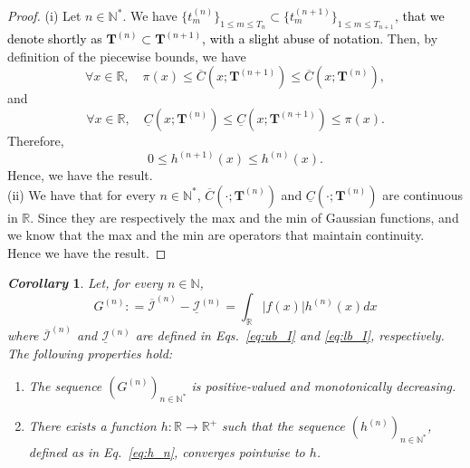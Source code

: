 \documentclass[review]{elsarticle}
\newcommand{\cblue}{\textcolor{black}}
\newtheorem{corollary}{\em Corollary}
\newcommand{\bR}{\mathbb{R}}
\begin{document}
\begin{proof}
(i)
Let $n \in \mathbb{N}^*$. We have $\{t_m^{(n)} \}_{1 \leq m \leq T_n} \subset \{t_m^{(n+1)} \}_{1 \leq m \leq T_{n+1} }$, \cblue{that we denote shortly as $\mathbf{T}^{(n)} \subset \mathbf{T}^{(n+1)}$, with a slight abuse of notation}. Then, by definition of the piecewise bounds, we have
\begin{equation}
\forall x \in \mathbb{R}, \quad \pi(x) \leq \overline{C}(x;\mathbf{T}^{(n+1)})  \leq \overline{C}(x;\mathbf{T}^{(n)}),
\end{equation}
and
\begin{equation}
\forall x \in \mathbb{R}, \quad 
\underline{C}(x;\mathbf{T}^{(n)})  \leq \underline{C}(x;\mathbf{T}^{(n+1)}) \leq \pi(x).
\end{equation}
Therefore,
\begin{equation}
0 \leq h^{(n+1)}(x)  \leq h^{(n)}(x).
\end{equation}
Hence, we have the result. \\
(ii) 
We have that for every $n \in \mathbb{N}^*$, $\overline{C}(\cdot;\mathbf{T}^{(n)})$ and $\underline{C}(\cdot;\mathbf{T}^{(n)})$ are continuous in $\mathbb{R}$. Since they are respectively the max and the min of Gaussian functions, and we know that the max and the min are operators that maintain continuity.\\
Hence we have the result.
\end{proof}

\begin{corollary}
Let, for every \( n \in \mathbb{N} \),
\begin{equation}
    G^{(n)} : = \overline{\mathcal{I}}^{(n)} - \underline{\mathcal{I}}^{(n)} = \int_{\bR}|f(x)|h^{(n)}(x)dx
    \label{eq:G_n}
\end{equation}
where \( \overline{\mathcal{I}}^{(n)} \) and \( \underline{\mathcal{I}}^{(n)} \) are defined in Eqs.~\ref{eq:ub_I} and \ref{eq:lb_I}, respectively. The following properties hold:
\begin{enumerate}
    \item[(i)] The sequence \( (G^{(n)})_{n \in \mathbb{N}^*} \) is positive-valued and monotonically decreasing.
    \item[(ii)] There exists a function \( h : \mathbb{R} \to \mathbb{R}^+ \) such that the sequence \( (h^{(n)})_{n \in \mathbb{N}^*} \), defined as in Eq.~\ref{eq:h_n}, converges pointwise to \( h \).
    \label{corollary_limit_h(n)}
\end{enumerate}
\end{corollary}
\end{document}
